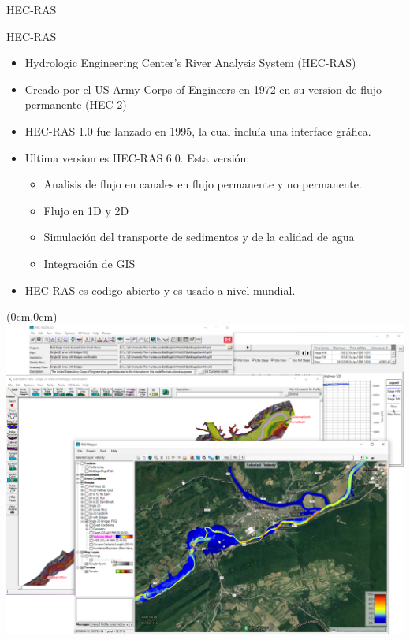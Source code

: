 \documentclass [xcolor=svgnames, t] {beamer}
\begin{document}
\begin{frame}{HEC-RAS}
\begin{block}{HEC-RAS}
\begin{itemize}
    \item Hydrologic Engineering Center's River Analysis System (HEC-RAS)
    \item Creado por el US Army Corps of Engineers en 1972 en su version de flujo permanente (HEC-2)
    \item HEC-RAS 1.0 fue lanzado en 1995, la cual inclu\'ia una interface gr\'afica. 
    \item Ultima version es HEC-RAS 6.0. Esta versi\'on:
        \begin{itemize}
            \item Analisis de flujo en canales en flujo permanente y no permanente.
            \item Flujo en 1D y 2D
            \item Simulaci\'on del transporte de sedimentos y de la calidad de agua
            \item Integraci\'on de GIS
        \end{itemize}
    \item HEC-RAS es codigo abierto y es usado a nivel mundial.
\end{itemize}
\end{block}
\end{frame} 

\begin{frame}{}
\begin{textblock*}{10.5cm}(0cm,0cm) %
\includegraphics[width=\textwidth]{RAS-60}
\end{textblock*}
\end{frame}{}
\end{document}
